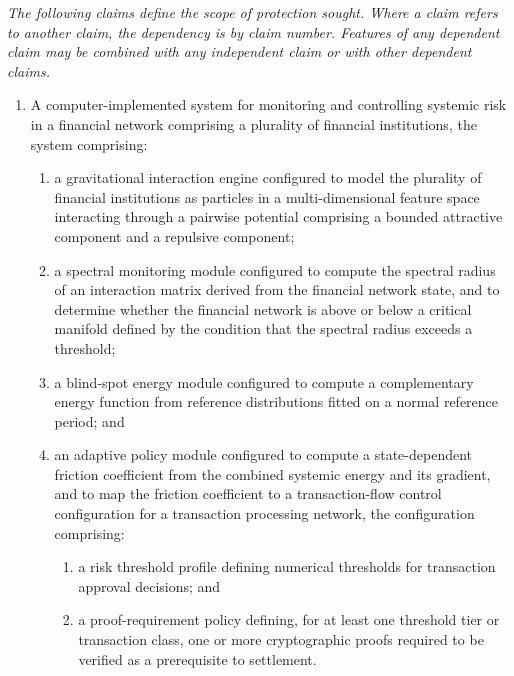 \documentclass[12pt,a4paper]{article}
\begin{document}
\noindent\textit{The following claims define the scope of protection
sought. Where a claim refers to another claim, the dependency is by claim
number. Features of any dependent claim may be combined with any
independent claim or with other dependent claims.}
\vspace{0.8em}

\begin{enumerate}[label=\textbf{\arabic*.}]

\item A computer-implemented system for monitoring and controlling systemic 
risk in a financial network comprising a plurality of financial institutions, 
the system comprising:
\begin{enumerate}[label=(\alph*)]
\item a gravitational interaction engine configured to model the plurality 
of financial institutions as particles in a multi-dimensional feature space 
interacting through a pairwise potential comprising a bounded attractive 
component and a repulsive component;

\item a spectral monitoring module configured to compute the spectral radius 
of an interaction matrix derived from the financial network state, and to 
determine whether the financial network is above or below a critical 
manifold defined by the condition that the spectral radius exceeds a 
threshold;

\item a blind-spot energy module configured to compute a complementary 
energy function from reference distributions fitted on a normal reference 
period; and

\item an adaptive policy module configured to compute a state-dependent 
friction coefficient from the combined systemic energy and its gradient, 
and to map the friction coefficient to a transaction-flow control 
configuration for a transaction processing network, the configuration 
comprising:
\begin{enumerate}[label=(\roman*)]
\item a risk threshold profile defining numerical thresholds for transaction 
approval decisions; and
\item a proof-requirement policy defining, for at least one threshold tier 
or transaction class, one or more cryptographic proofs required to be 
verified as a prerequisite to settlement.
\end{enumerate}
\end{enumerate}


\end{enumerate}
\end{document}

